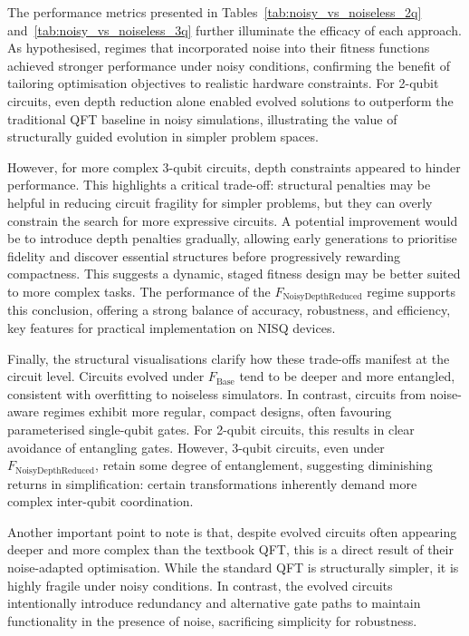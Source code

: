 \documentclass[11pt,a4paper]{article}
\begin{document}
The performance metrics presented in Tables~\ref{tab:noisy_vs_noiseless_2q} and~\ref{tab:noisy_vs_noiseless_3q} further illuminate the efficacy of each approach. As hypothesised, regimes that incorporated noise into their fitness functions achieved stronger performance under noisy conditions, confirming the benefit of tailoring optimisation objectives to realistic hardware constraints. For 2-qubit circuits, even depth reduction alone enabled evolved solutions to outperform the traditional QFT baseline in noisy simulations, illustrating the value of structurally guided evolution in simpler problem spaces.\newline

However, for more complex 3-qubit circuits, depth constraints appeared to hinder performance. This highlights a critical trade-off: structural penalties may be helpful in reducing circuit fragility for simpler problems, but they can overly constrain the search for more expressive circuits. A potential improvement would be to introduce depth penalties gradually, allowing early generations to prioritise fidelity and discover essential structures before progressively rewarding compactness. This suggests a dynamic, staged fitness design may be better suited to more complex tasks. The performance of the $F_{\mathrm{NoisyDepthReduced}}$ regime supports this conclusion, offering a strong balance of accuracy, robustness, and efficiency, key features for practical implementation on NISQ devices.\newline

Finally, the structural visualisations clarify how these trade-offs manifest at the circuit level. Circuits evolved under $F_{\mathrm{Base}}$ tend to be deeper and more entangled, consistent with overfitting to noiseless simulators. In contrast, circuits from noise-aware regimes exhibit more regular, compact designs, often favouring parameterised single-qubit gates. For 2-qubit circuits, this results in clear avoidance of entangling gates. However, 3-qubit circuits, even under $F_{\mathrm{NoisyDepthReduced}}$, retain some degree of entanglement, suggesting diminishing returns in simplification: certain transformations inherently demand more complex inter-qubit coordination.\newpage

Another important point to note is that, despite evolved circuits often appearing deeper and more complex than the textbook QFT, this is a direct result of their noise-adapted optimisation. While the standard QFT is structurally simpler, it is highly fragile under noisy conditions. In contrast, the evolved circuits intentionally introduce redundancy and alternative gate paths to maintain functionality in the presence of noise, sacrificing simplicity for robustness.\newline
\end{document}
